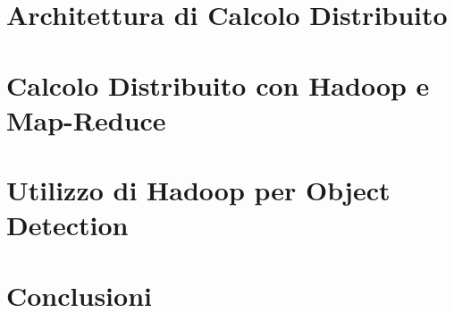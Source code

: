 \documentclass[12pt,a4paper,oneside]{report}
\begin{document}
  \chapter{Architettura di Calcolo Distribuito}
  
  \chapter{Calcolo Distribuito con Hadoop e Map-Reduce}
  
  \chapter{Utilizzo di Hadoop per Object Detection }
  
  \chapter{Conclusioni}
  
  
\end{document}
